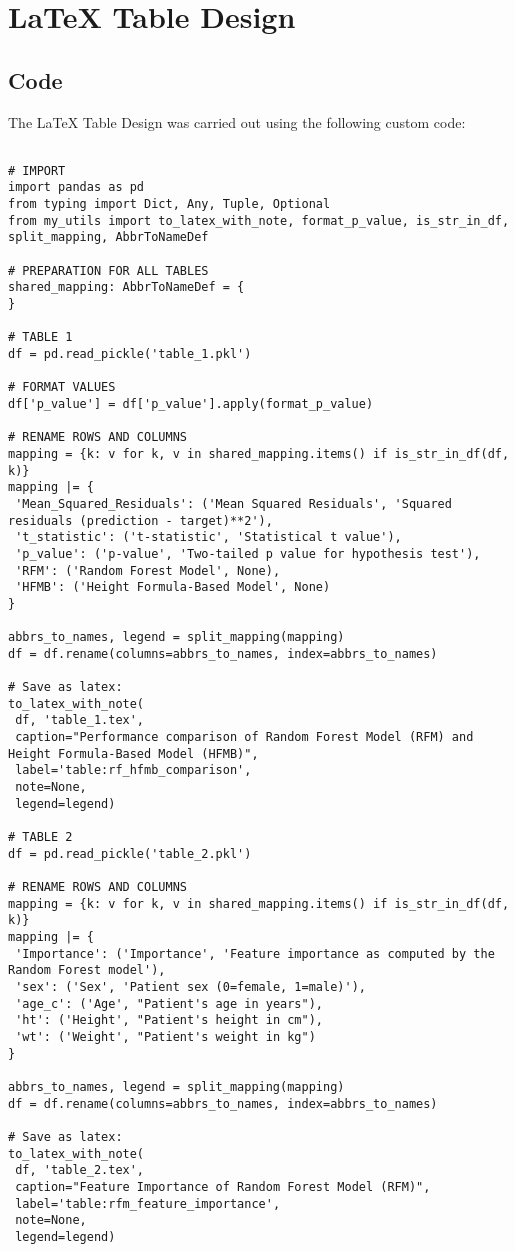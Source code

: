 \documentclass[11pt]{article}
\begin{document}
\section{LaTeX Table Design}
\subsection{{Code}}
The LaTeX Table Design was carried out using the following custom code:

\begin{verbatim}

# IMPORT
import pandas as pd
from typing import Dict, Any, Tuple, Optional
from my_utils import to_latex_with_note, format_p_value, is_str_in_df, split_mapping, AbbrToNameDef

# PREPARATION FOR ALL TABLES
shared_mapping: AbbrToNameDef = {
}

# TABLE 1
df = pd.read_pickle('table_1.pkl')

# FORMAT VALUES
df['p_value'] = df['p_value'].apply(format_p_value)

# RENAME ROWS AND COLUMNS
mapping = {k: v for k, v in shared_mapping.items() if is_str_in_df(df, k)} 
mapping |= {
 'Mean_Squared_Residuals': ('Mean Squared Residuals', 'Squared residuals (prediction - target)**2'),
 't_statistic': ('t-statistic', 'Statistical t value'),
 'p_value': ('p-value', 'Two-tailed p value for hypothesis test'),
 'RFM': ('Random Forest Model', None),
 'HFMB': ('Height Formula-Based Model', None)
}

abbrs_to_names, legend = split_mapping(mapping)
df = df.rename(columns=abbrs_to_names, index=abbrs_to_names)

# Save as latex:
to_latex_with_note(
 df, 'table_1.tex',
 caption="Performance comparison of Random Forest Model (RFM) and Height Formula-Based Model (HFMB)", 
 label='table:rf_hfmb_comparison',
 note=None,
 legend=legend)

# TABLE 2
df = pd.read_pickle('table_2.pkl')

# RENAME ROWS AND COLUMNS
mapping = {k: v for k, v in shared_mapping.items() if is_str_in_df(df, k)}
mapping |= {
 'Importance': ('Importance', 'Feature importance as computed by the Random Forest model'),
 'sex': ('Sex', 'Patient sex (0=female, 1=male)'),
 'age_c': ('Age', "Patient's age in years"),
 'ht': ('Height', "Patient's height in cm"),
 'wt': ('Weight', "Patient's weight in kg")
}

abbrs_to_names, legend = split_mapping(mapping)
df = df.rename(columns=abbrs_to_names, index=abbrs_to_names)

# Save as latex:
to_latex_with_note(
 df, 'table_2.tex',
 caption="Feature Importance of Random Forest Model (RFM)", 
 label='table:rfm_feature_importance',
 note=None,
 legend=legend)

\end{verbatim}
\end{document}
